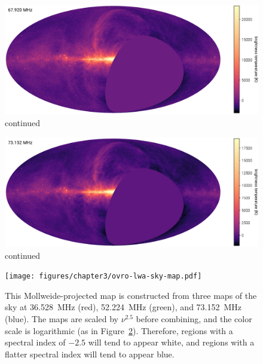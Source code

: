 \begin{bibunit}
\addtocounter{figure}{-1}
\begin{figure}
    \centering
    \includegraphics[width=\textwidth]{figures/chapter3/spw16}
    \caption{
        continued
    }
    \label{fig:channel-maps}
\end{figure}

\addtocounter{figure}{-1}
\begin{figure}
    \centering
    \includegraphics[width=\textwidth]{figures/chapter3/spw18}
    \caption{
        continued
    }
    \label{fig:channel-maps}
\end{figure}

\begin{figure}
    \centering
    \texttt{[image: figures/chapter3/ovro-lwa-sky-map.pdf]}
    \caption{
        This Mollweide-projected map is constructed from three maps of the sky at 36.528~MHz (red),
        52.224~MHz (green), and 73.152~MHz (blue). The maps are scaled by $\nu^{2.5}$ before
        combining, and the color scale is logarithmic (as in Figure~\ref{fig:channel-maps}).
        Therefore, regions with a spectral index of $-2.5$ will tend to appear white, and regions
        with a flatter spectral index will tend to appear blue.
    }
    \label{fig:three-color}
\end{figure}


\end{bibunit}
